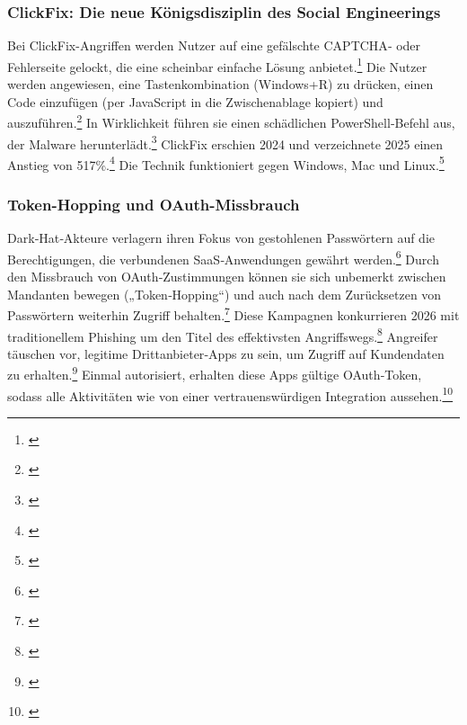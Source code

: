 \documentclass[10pt,a4paper]{article}
\begin{document}
	\subsubsection{ClickFix: Die neue Königsdisziplin des Social Engineerings}
	Bei ClickFix-Angriffen werden Nutzer auf eine gefälschte CAPTCHA‑ oder Fehlerseite gelockt, die eine scheinbar einfache Lösung anbietet.\footnote{\cite{SANSBlog}} Die Nutzer werden angewiesen, eine Tastenkombination (Windows+R) zu drücken, einen Code einzufügen (per JavaScript in die Zwischenablage kopiert) und auszuführen.\footnote{\cite{SANSBlog}} In Wirklichkeit führen sie einen schädlichen PowerShell‑Befehl aus, der Malware herunterlädt.\footnote{\cite{SANSBlog}} ClickFix erschien 2024 und verzeichnete 2025 einen Anstieg von 517\%.\footnote{\cite{SANSBlog}} Die Technik funktioniert gegen Windows, Mac und Linux.\footnote{\cite{SANSBlog}}
	
	\subsubsection{Token-Hopping und OAuth-Missbrauch}
	Dark‑Hat‑Akteure verlagern ihren Fokus von gestohlenen Passwörtern auf die Berechtigungen, die verbundenen SaaS‑Anwendungen gewährt werden.\footnote{\cite{ForescoutPredictions}} Durch den Missbrauch von OAuth‑Zustimmungen können sie sich unbemerkt zwischen Mandanten bewegen („Token‑Hopping“) und auch nach dem Zurücksetzen von Passwörtern weiterhin Zugriff behalten.\footnote{\cite{ForescoutPredictions}} Diese Kampagnen konkurrieren 2026 mit traditionellem Phishing um den Titel des effektivsten Angriffswegs.\footnote{\cite{ForescoutPredictions}} Angreifer täuschen vor, legitime Drittanbieter‑Apps zu sein, um Zugriff auf Kundendaten zu erhalten.\footnote{\cite{SecurityInsiderSalesforce}} Einmal autorisiert, erhalten diese Apps gültige OAuth‑Token, sodass alle Aktivitäten wie von einer vertrauenswürdigen Integration aussehen.\footnote{\cite{SecurityInsiderSalesforce}}
	
\end{document}

